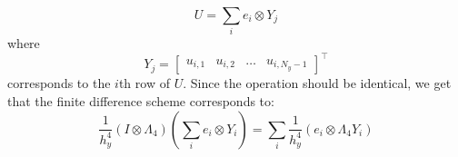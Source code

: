 \documentclass[reqno]{article}
\begin{document}
	\begin{equation}
		U = \sum_i e_i \otimes Y_j
	\end{equation}
	where
	\begin{equation}
		Y_j = \begin{bmatrix}
		u_{i, 1} &u_{i, 2} &\ldots &u_{i, N_y - 1}
		\end{bmatrix}^\top
	\end{equation}
	corresponds to the $i$th row of $U$. Since the operation should be identical, we get that the finite difference scheme corresponds to:
	\begin{equation}
		\frac{1}{h_y^4} \left(I\otimes \Lambda_4\right) \left( \sum_i e_i\otimes Y_i \right) = \sum_i \frac{1}{h_y^4} \left(e_i \otimes \Lambda_4 Y_i\right)
	\end{equation}
	
\end{document}
